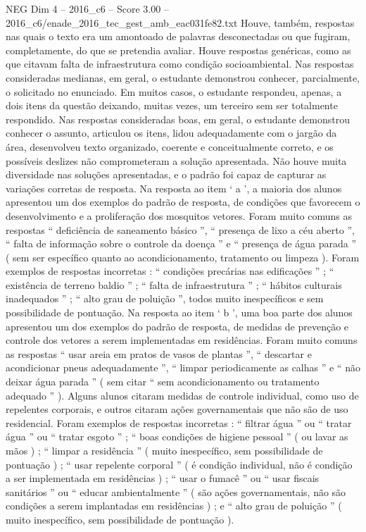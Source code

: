 \begin{textsample}{NEG Dim 4 – 2016\_c6 – Score 3.00 – 2016\_c6/enade\_2016\_tec\_gest\_amb\_eac031fe82.txt}
Houve, também, respostas nas quais o texto era um amontoado de palavras desconectadas ou que fugiram, completamente, do que se pretendia avaliar.
Houve respostas genéricas, como as que citavam falta de infraestrutura como condição socioambiental.
Nas respostas consideradas medianas, em geral, o estudante demonstrou conhecer, parcialmente, o solicitado no enunciado.
Em muitos casos, o estudante respondeu, apenas, a dois itens da questão deixando, muitas vezes, um terceiro sem ser totalmente respondido.
Nas respostas consideradas boas, em geral, o estudante demonstrou conhecer o assunto, articulou os itens, lidou adequadamente com o jargão da área, desenvolveu texto organizado, coerente e conceitualmente correto, e os possíveis deslizes não comprometeram a solução apresentada.
Não houve muita diversidade nas soluções apresentadas, e o padrão foi capaz de capturar as variações corretas de resposta.
Na resposta ao item ‘ a ’, a maioria dos alunos apresentou um dos exemplos do padrão de resposta, de condições que favorecem o desenvolvimento e a proliferação dos mosquitos vetores.
Foram muito comuns as respostas “ deficiência de saneamento básico ”, “ presença de lixo a céu aberto ”, “ falta de informação sobre o controle da doença ” e “ presença de água parada ” ( sem ser específico quanto ao acondicionamento, tratamento ou limpeza ).
Foram exemplos de respostas incorretas : “ condições precárias nas edificações ” ; “ existência de terreno baldio ” ; “ falta de infraestrutura ” ; “ hábitos culturais inadequados ” ; “ alto grau de poluição ”, todos muito inespecíficos e sem possibilidade de pontuação.
Na resposta ao item ‘ b ’, uma boa parte dos alunos apresentou um dos exemplos do padrão de resposta, de medidas de prevenção e controle dos vetores a serem implementadas em residências.
Foram muito comuns as respostas “ usar areia em pratos de vasos de plantas ”, “ descartar e acondicionar pneus adequadamente ”, “ limpar periodicamente as calhas ” e “ não deixar água parada ” ( sem citar “ sem acondicionamento ou tratamento adequado ” ).
Alguns alunos citaram medidas de controle individual, como uso de repelentes corporais, e outros citaram ações governamentais que não são de uso residencial.
Foram exemplos de respostas incorretas : “ filtrar água ” ou “ tratar água ” ou “ tratar esgoto ” ; “ boas condições de higiene pessoal ” ( ou lavar as mãos ) ; “ limpar a residência ” ( muito inespecífico, sem possibilidade de pontuação ) ; “ usar repelente corporal ” ( é condição individual, não é condição a ser implementada em residências ) ; “ usar o fumacê ” ou “ usar fiscais sanitários ” ou “ educar ambientalmente ” ( são ações governamentais, não são condições a serem implantadas em residências ) ; e “ alto grau de poluição ” ( muito inespecífico, sem possibilidade de pontuação ).

\end{textsample}
